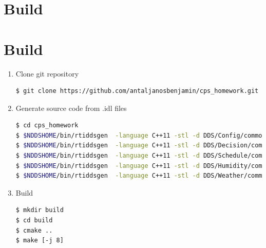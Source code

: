 \documentclass{article}
\begin{document}
\section{Build}

\section{Build}
\begin{enumerate}
\item Clone git repository
\begin{lstlisting}
$ git clone https://github.com/antaljanosbenjamin/cps_homework.git
\end{lstlisting}
\item Generate source code from .idl files
\begin{lstlisting}[language=bash]
$ cd cps_homework
$ $NDDSHOME/bin/rtiddsgen  -language C++11 -stl -d DDS/Config/common -replace idl_files/Config.idl
$ $NDDSHOME/bin/rtiddsgen  -language C++11 -stl -d DDS/Decision/common -replace idl_files/Decision.idl
$ $NDDSHOME/bin/rtiddsgen  -language C++11 -stl -d DDS/Schedule/common -replace idl_files/Schedule.idl
$ $NDDSHOME/bin/rtiddsgen  -language C++11 -stl -d DDS/Humidity/common -replace idl_files/UvegHaz.idl
$ $NDDSHOME/bin/rtiddsgen  -language C++11 -stl -d DDS/Weather/common -replace idl_files/Weather.idl
\end{lstlisting}
\item Build
\begin{lstlisting}
$ mkdir build
$ cd build
$ cmake ..
$ make [-j 8]
\end{lstlisting}
\end{enumerate}
\end{document}
